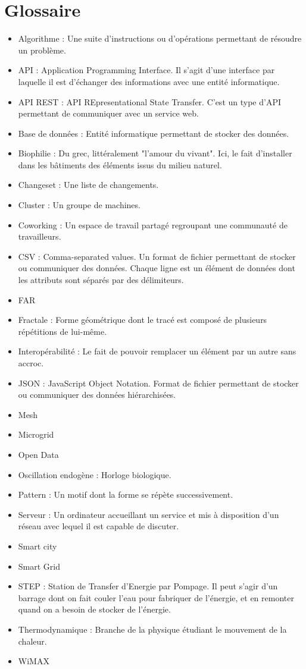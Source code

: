 \chapter*{Glossaire}

\begin{itemize}
    \item Algorithme : Une suite d'instructions ou d'opérations permettant de résoudre un problème.
    \item API : Application Programming Interface. Il s'agit d'une interface par laquelle
il est d'échanger des informations avec une entité informatique.
    \item API REST : API REpresentational State Transfer.
C'est un type d'API permettant de communiquer avec un service web.
    \item Base de données : Entité informatique permettant de stocker des données.
    \item Biophilie : Du grec, littéralement "l'amour du vivant".
Ici, le fait d'installer dans les bâtiments des éléments issus du milieu naturel.
    \item Changeset : Une liste de changements.
    \item Cluster : Un groupe de machines.
    \item Coworking : Un espace de travail partagé regroupant une communauté de travailleurs.
    \item CSV : Comma-separated values. Un format de fichier permettant de stocker ou communiquer des données.
Chaque ligne est un élément de données dont les attributs sont séparés par des délimiteurs.
    \item FAR
    \item Fractale : Forme géométrique dont le tracé est composé de plusieurs répétitions de lui-même.
    \item Interopérabilité : Le fait de pouvoir remplacer un élément par un autre sans accroc.
    \item JSON : JavaScript Object Notation. Format de fichier permettant de stocker ou communiquer des données hiérarchisées.
    \item Mesh
    \item Microgrid
    \item Open Data
    \item Oscillation endogène : Horloge biologique.
    \item Pattern : Un motif dont la forme se répète successivement.
    \item Serveur : Un ordinateur accueillant un service et mis à disposition d'un réseau avec lequel il est capable de discuter.
    \item Smart city
    \item Smart Grid
    \item STEP : Station de Transfer d'Energie par Pompage.
Il peut s'agir d'un barrage dont on fait couler l'eau pour fabriquer de l'énergie, et en remonter quand on a besoin de stocker de l'énergie.
    \item Thermodynamique : Branche de la physique étudiant le mouvement de la chaleur.
    \item WiMAX
\end{itemize}